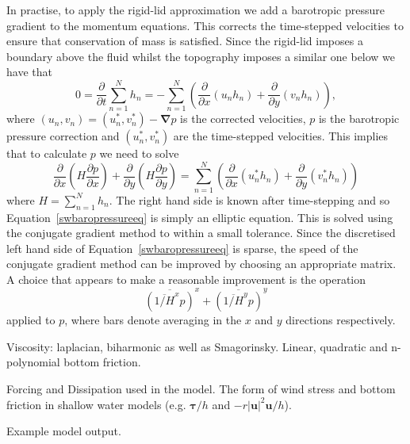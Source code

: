 \documentclass[10pt,a4paper]{report}
\newcommand*\equref[1]{Equation~\eqref{#1}}
\begin{document}
  In practise, to apply the rigid-lid approximation we add a barotropic pressure
  gradient to the momentum equations. This corrects the time-stepped velocities 
  to ensure that conservation of mass is satisfied. Since the rigid-lid imposes a
  boundary above the fluid whilst the topography imposes a similar one below 
  we have that 
  \begin{equation}
  0=\frac{  \partial}{\partial t} \sum^{N}_{n=1} h_{n} = -
  \sum^{N}_{n=1} \left( \frac{\partial }{\partial x} (u_{n}h_{n} )+ 
  \frac{\partial }{\partial y} (v_{n}h_{n} ) \right) ,
  \end{equation}
  where $\left(u_n,v_n\right)=\left(u_n^{*},v^{*}_n\right)-\boldsymbol{\nabla}p$
  is the corrected velocities, $p$ is the barotropic pressure correction and
  $\left(u_n^{*},v^{*}_n\right)$ are the time-stepped velocities. This implies that to
  calculate $p$ we need to solve 
  \begin{equation}
  \frac{  \partial}{\partial x} \left( H \frac{  \partial p}{\partial x} \right) +
  \frac{  \partial}{\partial y} \left( H \frac{  \partial p}{\partial y} \right) =
  \sum^{N}_{n=1} \left( \frac{\partial }{\partial x} (u^{*}_{n}h_{n} )+ 
  \frac{\partial }{\partial y} (v^{*}_{n}h_{n} ) \right)
  \label{swbaropressureeq}
  \end{equation}
  where $H= \sum^{N}_{n=1} h_{n}$. The right hand side is known after time-stepping 
  and so \equref{swbaropressureeq} is simply an elliptic equation. This is solved using
  the conjugate gradient method to within a small tolerance. Since
  the discretised left hand side of \equref{swbaropressureeq} is sparse, the speed of the 
  conjugate gradient method can be improved by choosing an appropriate matrix.
  A choice that appears to make a reasonable improvement is the operation
  \begin{equation}
  \overline{\left(\overline{1/H}^{x} p\right) }^{x} + \overline{\left(\overline{1/H}^{y} p\right) }^{y}
  \end{equation}
  applied to $p$, where bars denote averaging in the $x$ and $y$ directions respectively.
  
Viscosity:
laplacian, biharmonic as well as Smagorinsky.
Linear, quadratic and n-polynomial bottom friction.

Forcing and Dissipation used in the model.
The form of wind stress and bottom friction in
shallow water models (e.g. $\boldsymbol{\tau}/h$ and 
$-r\left|\boldsymbol{u}\right|^{2}\boldsymbol{u}/h$). 

Example model output.
\end{document}
